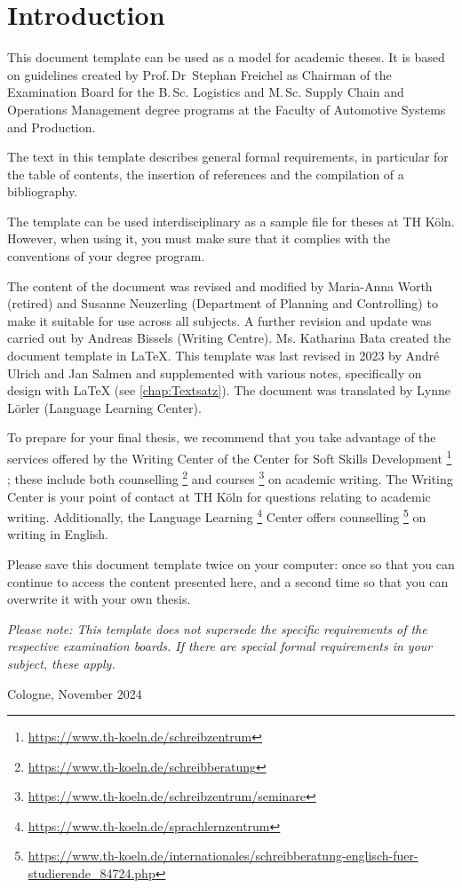 \chapter{Introduction}
%
This document template can be used as a model for academic theses. It is based on 
guidelines created by Prof.\,Dr~Stephan Freichel as Chairman of the Examination 
Board for the B.\,Sc. Logistics and M.\,Sc. Supply Chain and Operations 
Management degree programs at the Faculty of Automotive Systems and Production.

The text in this template describes general formal requirements, in particular 
for the table of contents, the insertion of references and the compilation of a 
bibliography.

The template can be used interdisciplinary as a sample file for theses at TH 
Köln. However, when using it, you must make sure that it complies with the 
conventions of your degree program.

The content of the document was revised and modified by Maria-Anna Worth 
(retired) and Susanne Neuzerling (Department of Planning and Controlling) to make 
it suitable for use across all subjects. A further revision and update was 
carried out by Andreas Bissels (Writing Centre). Ms. Katharina Bata created the 
document template in LaTeX. This template was last revised in 2023 by André 
Ulrich and Jan Salmen and supplemented with various notes, specifically on design 
with \LaTeX{} (see \cref{chap:Textsatz}). The document was translated by Lynne 
Lörler (Language Learning Center).

To prepare for your final thesis, we recommend that you take advantage of the 
services offered by the Writing Center of the Center for Soft Skills Development%
\footnote{\href{https://www.th-koeln.de/schreibzentrum}{https://www.th-koeln.de/schreibzentrum}}%
; these include both counselling%
\footnote{\href{https://www.th-koeln.de/schreibberatung}{https://www.th-koeln.de/schreibberatung}}
and courses%
\footnote{\href{https://www.th-koeln.de/schreibzentrum/seminare}{https://www.th-koeln.de/schreibzentrum/seminare}}
on academic writing. The Writing Center is 
your point of contact at TH Köln for questions relating to academic writing.
Additionally, the Language Learning%
\footnote{\href{https://www.th-koeln.de/sprachlernzentrum}{https://www.th-koeln.de/sprachlernzentrum}}
Center offers counselling%
\footnote{\href{https://www.th-koeln.de/internationales/schreibberatung-englisch-fuer-studierende_84724.php}{https://www.th-koeln.de/internationales/schreibberatung-englisch-fuer-studierende\_84724.php}}
on writing in English.

Please save this document template twice on your computer: once so that you can 
continue to access the content presented here, and a second time so that you can 
overwrite it with your own thesis.

\emph{Please note: This template does not supersede the specific requirements of the respective examination boards. If there are special formal requirements in your subject, these apply.}%
%
\begin{flushright}
Cologne, November 2024
\end{flushright}